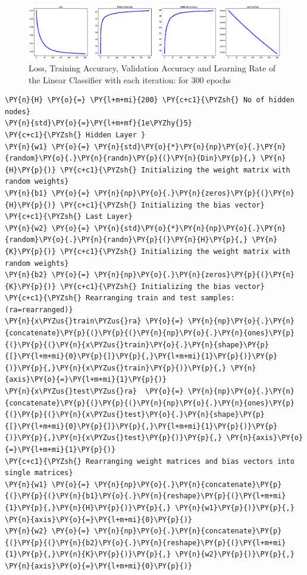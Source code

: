 \documentclass[a4paper,11pt]{article}%
\begin{document}
\begin{figure}[!h]
	\centering
	\includegraphics[scale=0.25]{figures/part1plots}
	\caption{Loss, Training Accuracy, Validation Accuracy and Learning Rate of the Linear Classifier with each iteration: for 300 epochs}
\end{figure}

    \begin{tcolorbox}[breakable, size=fbox, boxrule=1pt, pad at break*=1mm,colback=cellbackground, colframe=cellborder]
\begin{Verbatim}[commandchars=\\\{\}]
\PY{n}{H} \PY{o}{=} \PY{l+m+mi}{200} \PY{c+c1}{\PYZsh{} No of hidden nodes}
\PY{n}{std}\PY{o}{=}\PY{l+m+mf}{1e\PYZhy{}5} 
\PY{c+c1}{\PYZsh{} Hidden Layer }
\PY{n}{w1} \PY{o}{=} \PY{n}{std}\PY{o}{*}\PY{n}{np}\PY{o}{.}\PY{n}{random}\PY{o}{.}\PY{n}{randn}\PY{p}{(}\PY{n}{Din}\PY{p}{,} \PY{n}{H}\PY{p}{)} \PY{c+c1}{\PYZsh{} Initializing the weight matrix with random weights}
\PY{n}{b1} \PY{o}{=} \PY{n}{np}\PY{o}{.}\PY{n}{zeros}\PY{p}{(}\PY{n}{H}\PY{p}{)} \PY{c+c1}{\PYZsh{} Initializing the bias vector}
\PY{c+c1}{\PYZsh{} Last Layer}
\PY{n}{w2} \PY{o}{=} \PY{n}{std}\PY{o}{*}\PY{n}{np}\PY{o}{.}\PY{n}{random}\PY{o}{.}\PY{n}{randn}\PY{p}{(}\PY{n}{H}\PY{p}{,} \PY{n}{K}\PY{p}{)} \PY{c+c1}{\PYZsh{} Initializing the weight matrix with random weights}
\PY{n}{b2} \PY{o}{=} \PY{n}{np}\PY{o}{.}\PY{n}{zeros}\PY{p}{(}\PY{n}{K}\PY{p}{)} \PY{c+c1}{\PYZsh{} Initializing the bias vector}
\PY{c+c1}{\PYZsh{} Rearranging train and test samples: (ra=rearranged)}
\PY{n}{x\PYZus{}train\PYZus{}ra} \PY{o}{=} \PY{n}{np}\PY{o}{.}\PY{n}{concatenate}\PY{p}{(}\PY{p}{(}\PY{n}{np}\PY{o}{.}\PY{n}{ones}\PY{p}{(}\PY{p}{(}\PY{n}{x\PYZus{}train}\PY{o}{.}\PY{n}{shape}\PY{p}{[}\PY{l+m+mi}{0}\PY{p}{]}\PY{p}{,}\PY{l+m+mi}{1}\PY{p}{)}\PY{p}{)}\PY{p}{,}\PY{n}{x\PYZus{}train}\PY{p}{)}\PY{p}{,} \PY{n}{axis}\PY{o}{=}\PY{l+m+mi}{1}\PY{p}{)}
\PY{n}{x\PYZus{}test\PYZus{}ra}  \PY{o}{=} \PY{n}{np}\PY{o}{.}\PY{n}{concatenate}\PY{p}{(}\PY{p}{(}\PY{n}{np}\PY{o}{.}\PY{n}{ones}\PY{p}{(}\PY{p}{(}\PY{n}{x\PYZus{}test}\PY{o}{.}\PY{n}{shape}\PY{p}{[}\PY{l+m+mi}{0}\PY{p}{]}\PY{p}{,}\PY{l+m+mi}{1}\PY{p}{)}\PY{p}{)}\PY{p}{,}\PY{n}{x\PYZus{}test}\PY{p}{)}\PY{p}{,} \PY{n}{axis}\PY{o}{=}\PY{l+m+mi}{1}\PY{p}{)}
\PY{c+c1}{\PYZsh{} Rearranging weight matrices and bias vectors into single matrices}
\PY{n}{w1} \PY{o}{=} \PY{n}{np}\PY{o}{.}\PY{n}{concatenate}\PY{p}{(}\PY{p}{(}\PY{n}{b1}\PY{o}{.}\PY{n}{reshape}\PY{p}{(}\PY{l+m+mi}{1}\PY{p}{,}\PY{n}{H}\PY{p}{)}\PY{p}{,} \PY{n}{w1}\PY{p}{)}\PY{p}{,} \PY{n}{axis}\PY{o}{=}\PY{l+m+mi}{0}\PY{p}{)}
\PY{n}{w2} \PY{o}{=} \PY{n}{np}\PY{o}{.}\PY{n}{concatenate}\PY{p}{(}\PY{p}{(}\PY{n}{b2}\PY{o}{.}\PY{n}{reshape}\PY{p}{(}\PY{l+m+mi}{1}\PY{p}{,}\PY{n}{K}\PY{p}{)}\PY{p}{,} \PY{n}{w2}\PY{p}{)}\PY{p}{,} \PY{n}{axis}\PY{o}{=}\PY{l+m+mi}{0}\PY{p}{)}
\end{Verbatim}
\end{tcolorbox}
\end{document}
